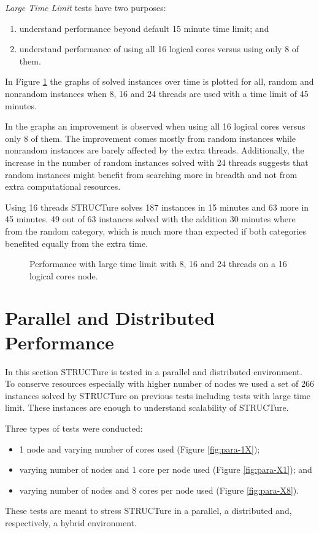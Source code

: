 \emph{Large Time Limit} tests have two purposes:
\begin{enumerate}
  \item understand performance beyond default 15 minute time limit; and
  \item understand performance of using all 16 logical cores versus
  using only 8 of them.
\end{enumerate}

In Figure \ref{fig:large} the graphs of solved instances over time is
plotted for all, random and nonrandom instances when 8, 16 and 24
threads are used with a time limit of 45 minutes.

In the graphs an improvement is observed when using all 16 logical
cores versus only 8 of them. The improvement comes mostly from
random instances while nonrandom instances are barely affected
by the extra threads.  Additionally, the increase in the number
of random instances solved with 24 threads suggests that random
instances might benefit from searching more in breadth and not from
extra computational resources.

Using 16 threads STRUCTure solves 187 instances in 15 minutes and 63
more in 45 minutes. 49 out of 63 instances solved with the addition
30 minutes where from the random category, which is much more than
expected if both categories benefited equally from the extra time.

\begin{figure}
  \centering
  \caption{Performance with large time limit with 8, 16 and 24
  threads on a 16 logical cores node.}
  \label{fig:large}
\end{figure}


\section{Parallel and Distributed Performance}

In this section STRUCTure is tested in a parallel and distributed
environment. To conserve resources especially with higher number
of nodes we used a set of 266 instances solved by STRUCTure on
previous tests including tests with large time limit. These instances
are enough to understand scalability of STRUCTure.

Three types of tests were conducted:
\begin{itemize}
  \item 1 node and varying number of cores used (Figure \ref{fig:para-1X});
  \item varying number of nodes and 1 core per node used (Figure \ref{fig:para-X1}); and
  \item varying number of nodes and 8 cores per node used (Figure \ref{fig:para-X8}).
\end{itemize}
These tests are meant to stress STRUCTure in a parallel, a distributed
and, respectively, a hybrid environment.

